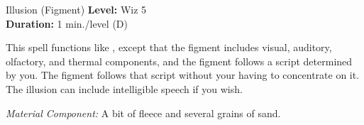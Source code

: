 {Illusion (Figment)}
{
	\textbf{Level:}
	Wiz 5\\
	\textbf{Duration:}
	1 min./level (D)\\
}
{
	This spell functions like , except that the figment includes visual, auditory, olfactory, and thermal components, and the figment follows a script determined by you. The figment follows that script without your having to concentrate on it. The illusion can include intelligible speech if you wish.

	\textit{Material Component:}
	A bit of fleece and several grains of sand.

}
